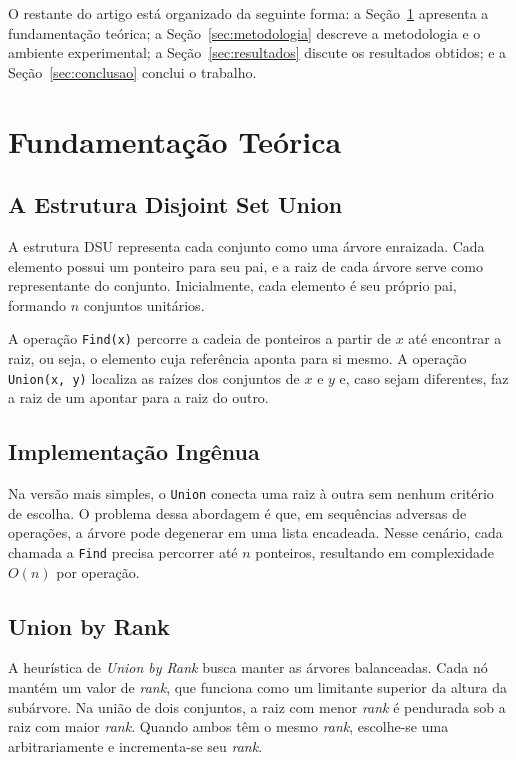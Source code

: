 \documentclass[12pt]{article}
\begin{document}
O restante do artigo está organizado da seguinte forma: a Seção~\ref{sec:fundamentacao} apresenta a fundamentação teórica; a Seção~\ref{sec:metodologia} descreve a metodologia e o ambiente experimental; a Seção~\ref{sec:resultados} discute os resultados obtidos; e a Seção~\ref{sec:conclusao} conclui o trabalho.


\section{Fundamentação Teórica}
\label{sec:fundamentacao}

\subsection{A Estrutura Disjoint Set Union}

A estrutura DSU representa cada conjunto como uma árvore enraizada. Cada elemento possui um ponteiro para seu pai, e a raiz de cada árvore serve como representante do conjunto. Inicialmente, cada elemento é seu próprio pai, formando $n$ conjuntos unitários.

A operação \texttt{Find(x)} percorre a cadeia de ponteiros a partir de $x$ até encontrar a raiz, ou seja, o elemento cuja referência aponta para si mesmo. A operação \texttt{Union(x, y)} localiza as raízes dos conjuntos de $x$ e $y$ e, caso sejam diferentes, faz a raiz de um apontar para a raiz do outro.

\subsection{Implementação Ingênua}

Na versão mais simples, o \texttt{Union} conecta uma raiz à outra sem nenhum critério de escolha. O problema dessa abordagem é que, em sequências adversas de operações, a árvore pode degenerar em uma lista encadeada. Nesse cenário, cada chamada a \texttt{Find} precisa percorrer até $n$ ponteiros, resultando em complexidade $O(n)$ por operação.

\subsection{Union by Rank}

A heurística de \textit{Union by Rank} busca manter as árvores balanceadas. Cada nó mantém um valor de \textit{rank}, que funciona como um limitante superior da altura da subárvore. Na união de dois conjuntos, a raiz com menor \textit{rank} é pendurada sob a raiz com maior \textit{rank}. Quando ambos têm o mesmo \textit{rank}, escolhe-se uma arbitrariamente e incrementa-se seu \textit{rank}.
\end{document}
